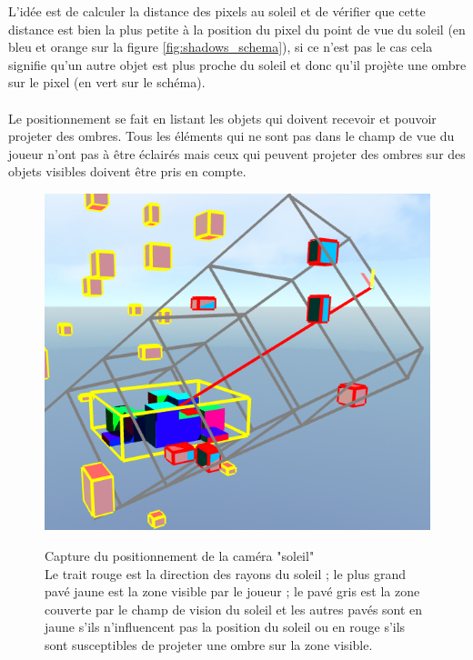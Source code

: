 \documentclass{EPUProjetDi}
\begin{document}
L'idée est de calculer la distance des pixels au soleil et de vérifier que cette distance est bien la plus petite à la position du pixel du point de vue du soleil (en bleu et orange sur la figure \ref{fig:shadows_schema}), si ce n'est pas le cas cela signifie qu'un autre objet est plus proche du soleil et donc qu'il projète une ombre sur le pixel (en vert sur le schéma).

\paragraph{}
Le positionnement se fait en listant les objets qui doivent recevoir et pouvoir projeter des ombres. Tous les éléments qui ne sont pas dans le champ de vue du joueur n'ont pas à être éclairés mais ceux qui peuvent projeter des ombres sur des objets visibles doivent être pris en compte.

\begin{figure}
	\centering
	\caption[Capture du positionnement de la caméra "soleil"]{Capture du positionnement de la caméra "soleil"\\Le trait rouge est la direction des rayons du soleil ; le plus grand pavé jaune est la zone visible par le joueur ; le pavé gris est la zone couverte par le champ de vision du soleil et les autres pavés sont en jaune s'ils n'influencent pas la position du soleil ou en rouge s'ils sont susceptibles de projeter une ombre sur la zone visible.}
	\includegraphics[scale=.49]{casted_shadows}
	\label{fig:sun_camera_position}
	\vspace{-10pt}
\end{figure}
\end{document}
